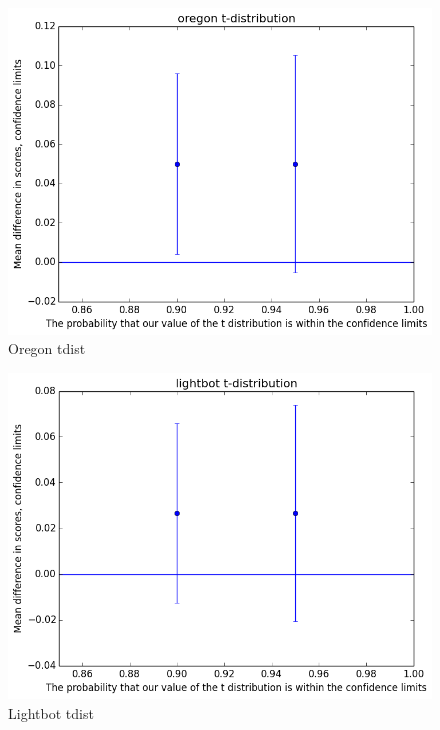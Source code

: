 			\begin{figure}[] 
				\centering 
				\includegraphics[width=\textwidth]{oregon_tdist.png} 
				\caption{Oregon tdist}
			\end{figure}
			\begin{figure}[] 
				\centering 
				\includegraphics[width=\textwidth]{lightbot_tdist.png} 
				\caption{Lightbot tdist}
			\end{figure}

